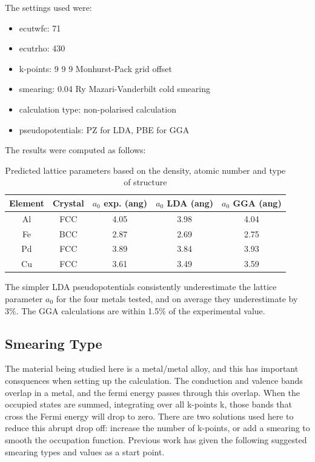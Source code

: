 The settings used were:

\begin{itemize}
\item ecutwfc: 71 
\item ecutrho: 430 
\item k-points: 9 9 9 Monhurst-Pack grid offset
\item smearing: 0.04 Ry Mazari-Vanderbilt cold smearing
\item calculation type: non-polarised calculation
\item pseudopotentials: PZ for LDA, PBE for GGA
\end{itemize}

The results were computed as follows:

\begin{table}[h]
\begin{center}
\begin{tabular}{c c c c c}
\hline\hline
Element & Crystal & $a_0$ exp. (ang) & $a_0$ LDA (ang) & $a_0$ GGA (ang) \\
\hline\hline
Al     & FCC  &  4.05  &  3.98  &  4.04   \\ 
Fe     & BCC  &  2.87  &  2.69  &  2.75   \\ 
Pd     & FCC  &  3.89  &  3.84  &  3.93   \\ 
Cu     & FCC  &  3.61  &  3.49  &  3.59   \\ 
\hline\hline
\end{tabular}
\end{center}
\caption{Predicted lattice parameters based on the density, atomic number and type of structure}
\label{table:computedlattice}
\end{table}

The simpler LDA pseudopotentials consistently underestimate the lattice parameter $a_0$ for the four metals tested, and on average they underestimate by 3\%.  The GGA calculations are within 1.5\% of the experimental value.


\subsection{Smearing Type}

The material being studied here is a metal/metal alloy, and this has important consquences when setting up the calculation.  The conduction and valence bands overlap in a metal, and the fermi energy passes through this overlap. When the occupied states are summed, integrating over all k-points k\cite{marzarivanderbilt}, those bands that cross the Fermi energy will drop to zero.  There are two solutions used here to reduce this abrupt drop off: increase the number of k-points, or add a smearing to smooth the occupation function.  Previous work has given the following suggested smearing types and values as a start point.

